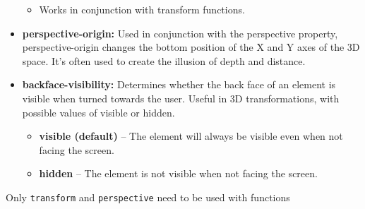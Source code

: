 \documentclass{report}
\begin{document}
\begin{itemize}
            \begin{itemize}
                \item Works in conjunction with transform functions.
            \end{itemize}
        \item \textbf{perspective-origin:} Used in conjunction with the perspective property, perspective-origin changes the bottom position of the X and Y axes of the 3D space. It's often used to create the illusion of depth and distance.
        \item \textbf{backface-visibility:} Determines whether the back face of an element is visible when turned towards the user. Useful in 3D transformations, with possible values of visible or hidden.
            \begin{itemize}
                \item \textbf{visible (default)} – The element will always be visible even when not facing the screen.
                \item \textbf{hidden} – The element is not visible when not facing the screen.
            \end{itemize}
    \end{itemize}

    \bigbreak \noindent 
    \begin{notebox}
        Only \texttt{transform} and \texttt{perspective} need to be used with functions 
    \end{notebox}


    \pagebreak \bigbreak \noindent 
\end{document}
